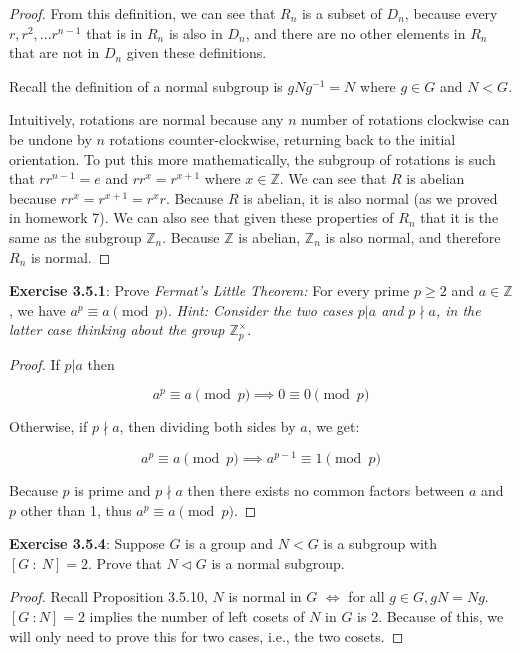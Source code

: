 \documentclass[a4paper]{article}
\begin{document}
\begin{myparindent}{0pt}
\begin{proof}
  From this definition, we can see that $R_n$ is a subset of $D_n$, because
  every $r, r^2, ... r^{n-1}$ that is in $R_n$ is also in $D_n$, and there are
  no other elements in $R_n$ that are not in $D_n$ given these definitions.
  \newline

  Recall the definition of a normal subgroup is $gNg^{-1} = N$ where $g \in G$
  and $N < G$. \newline

  Intuitively, rotations are normal because any $n$ number of rotations
  clockwise can be undone by $n$ rotations counter-clockwise, returning back
  to the initial orientation. To put this more mathematically, the subgroup of
  rotations is such that $rr^{n-1} = e$ and $rr^{x} = r^{x+1}$ where
  $x \in \mathbb{Z}$. We can see that $R$ is abelian because
  $rr^{x} = r^{x+1} = r^{x}r$. Because $R$ is abelian, it is also normal (as
  we proved in homework 7). We can also see that given these properties of $R_n$
  that it is the same as the subgroup $\mathbb{Z}_n$. Because $\mathbb{Z}$ is
  abelian, $\mathbb{Z}_n$ is also normal, and therefore $R_n$ is normal.
\end{proof}

\textbf{Exercise 3.5.1}:
Prove \textit{Fermat's Little Theorem:} For every prime $p \ge 2$ and
$a \in \mathbb{Z}$, we have $a^p \equiv a \pmod p$. \textit{Hint: Consider the
two cases $p|a$ and $p \nmid a$, in the latter case thinking about the group
$\mathbb{Z}_p^{\times}$}.
\begin{proof}
  If $p | a$ then

  \[ a^p \equiv a \pmod p \implies 0 \equiv 0 \pmod p \]

  Otherwise, if $p \nmid a$, then dividing both sides by $a$, we get:

  \[ a^p \equiv a \pmod p \implies a^{p-1} \equiv 1 \pmod p \]

  Because $p$ is prime and $p \nmid a$ then there exists no common factors
  between $a$ and $p$ other than 1, thus $a^p \equiv a \pmod p$.
\end{proof}

\textbf{Exercise 3.5.4}:
Suppose $G$ is a group and $N < G$ is a subgroup with $[G ~: ~N] = 2$. Prove
that $N \triangleleft G$ is a normal subgroup.
\begin{proof}
  Recall Proposition 3.5.10, $N$ is normal in $G$ $\iff$ for all $g \in G, gN = Ng$.
  \newline
  $[G ~: N] = 2$ implies the number of left cosets of $N$ in $G$ is 2. Because
  of this, we will only need to prove this for two cases, i.e., the two cosets.
  \newline


\end{proof}
\end{myparindent}
\end{document}
